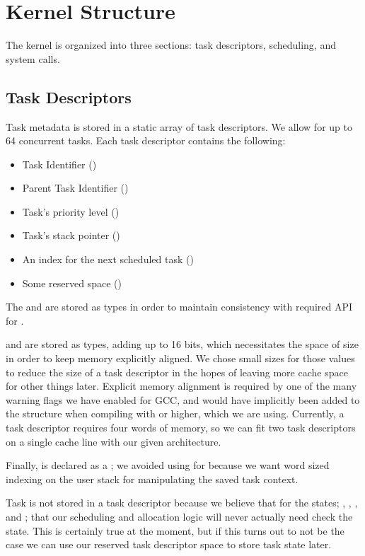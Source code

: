 \documentclass[pdftex,10pt,a4paper]{article}
\begin{document}
\newpage
\section*{Kernel Structure}

The kernel is organized into three sections: task descriptors,
scheduling, and system calls.

\subsection*{Task Descriptors}

Task metadata is stored in a static array of task descriptors. We
allow for up to 64 concurrent tasks. Each task descriptor contains the
following:
\begin{itemize}
  \item Task Identifier ()
  \item Parent Task Identifier ()
  \item Task's priority level ()
  \item Task's stack pointer ()
  \item An index for the next scheduled task ()
  \item Some reserved space ()
\end{itemize}

The  and  are stored as  types in order to
maintain consistency with required API for .

 and  are stored as  types,
adding up to 16 bits, which necessitates the  space of
size  in order to keep memory explicitly aligned. We
chose small sizes for those values to reduce the size of a task
descriptor in the hopes of leaving more cache space for other things
later. Explicit memory alignment is required by one of the many
warning flags we have enabled for GCC, and would have implicitly been
added to the structure when compiling with  or higher, which
we are using. Currently, a task descriptor requires four words of
memory, so we can fit two task descriptors on a single cache line with
our given architecture.

Finally,  is declared as a ; we avoided
using  for  because we want word sized indexing on
the user stack for manipulating the saved task context.

Task  is not stored in a task descriptor because we believe
that for the states; , , , and
; that our scheduling and allocation logic will never
actually need check the state. This is certainly true at the moment,
but if this turns out to not be the case we can use our reserved task
descriptor space to store task state later.
\end{document}
